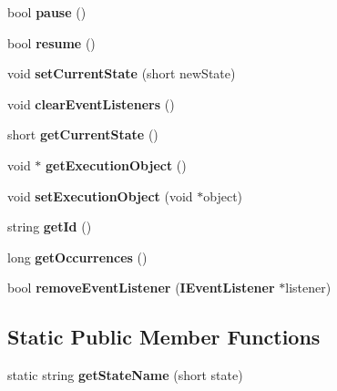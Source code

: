 \begin{CompactItemize}
\item 
bool \textbf{pause} ()\label{classbr_1_1pucrio_1_1telemidia_1_1ginga_1_1ncl_1_1model_1_1event_1_1FormatterEvent_2853250ac5b9806e29d41f6f37b3b7f0}

\item 
bool \textbf{resume} ()\label{classbr_1_1pucrio_1_1telemidia_1_1ginga_1_1ncl_1_1model_1_1event_1_1FormatterEvent_28614c8a58170f93be7e0eab1c70a2bd}

\item 
void \textbf{setCurrentState} (short newState)\label{classbr_1_1pucrio_1_1telemidia_1_1ginga_1_1ncl_1_1model_1_1event_1_1FormatterEvent_acac031e17c24686578c00a857a9f329}

\item 
void \textbf{clearEventListeners} ()\label{classbr_1_1pucrio_1_1telemidia_1_1ginga_1_1ncl_1_1model_1_1event_1_1FormatterEvent_80cfa040459ff53594adbd6a51ec8f43}

\item 
short \textbf{getCurrentState} ()\label{classbr_1_1pucrio_1_1telemidia_1_1ginga_1_1ncl_1_1model_1_1event_1_1FormatterEvent_64651fcbe7469e14605b484ca5fe7230}

\item 
void $\ast$ \textbf{getExecutionObject} ()\label{classbr_1_1pucrio_1_1telemidia_1_1ginga_1_1ncl_1_1model_1_1event_1_1FormatterEvent_e98f1f023bad6b2e0c4a643ac236fdec}

\item 
void \textbf{setExecutionObject} (void $\ast$object)\label{classbr_1_1pucrio_1_1telemidia_1_1ginga_1_1ncl_1_1model_1_1event_1_1FormatterEvent_9f60a2b12ecb7749a92ba3553000d9ee}

\item 
string \textbf{getId} ()\label{classbr_1_1pucrio_1_1telemidia_1_1ginga_1_1ncl_1_1model_1_1event_1_1FormatterEvent_bba5652b12c4d6161f860eb44d5789d8}

\item 
long \textbf{getOccurrences} ()\label{classbr_1_1pucrio_1_1telemidia_1_1ginga_1_1ncl_1_1model_1_1event_1_1FormatterEvent_ba990eae7dbdec7b25dc895299691e57}

\item 
bool \textbf{removeEventListener} ({\bf IEventListener} $\ast$listener)\label{classbr_1_1pucrio_1_1telemidia_1_1ginga_1_1ncl_1_1model_1_1event_1_1FormatterEvent_1b93d568478575ca518947832ae96386}

\end{CompactItemize}
\subsection*{Static Public Member Functions}
\begin{CompactItemize}
\item 
static string \textbf{getStateName} (short state)\label{classbr_1_1pucrio_1_1telemidia_1_1ginga_1_1ncl_1_1model_1_1event_1_1FormatterEvent_f410e4d1b6ae23bbf6d8632557271cbb}

\end{CompactItemize}
